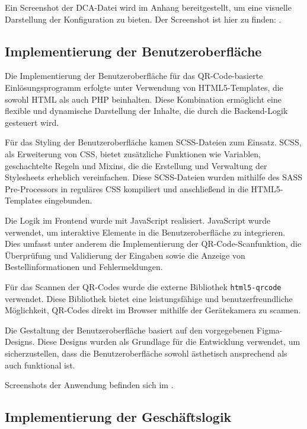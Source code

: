 Ein Screenshot der DCA-Datei wird im Anhang bereitgestellt, um eine visuelle Darstellung der Konfiguration zu bieten. Der Screenshot ist hier zu finden: .

\subsection{Implementierung der Benutzeroberfläche}
\label{sec:ImplementierungBenutzeroberflaeche}

Die Implementierung der Benutzeroberfläche für das QR-Code-basierte Einlösungsprogramm erfolgte unter Verwendung von HTML5-Templates, die sowohl \acs{HTML} als auch \acs{PHP} beinhalten. Diese Kombination ermöglicht eine flexible und dynamische Darstellung der Inhalte, die durch die Backend-Logik gesteuert wird.

Für das Styling der Benutzeroberfläche kamen SCSS-Dateien zum Einsatz. \acs{SCSS}, als Erweiterung von \acs{CSS}, bietet zusätzliche Funktionen wie Variablen, geschachtelte Regeln und Mixins, die die Erstellung und Verwaltung der Stylesheets erheblich vereinfachen. Diese SCSS-Dateien wurden mithilfe des \acs{SASS} Pre-Processors in reguläres \acs{CSS} kompiliert und anschließend in die HTML5-Templates eingebunden.

Die Logik im Frontend wurde mit JavaScript realisiert. JavaScript wurde verwendet, um interaktive Elemente in die Benutzeroberfläche zu integrieren. Dies umfasst unter anderem die Implementierung der QR-Code-Scanfunktion, die Überprüfung und Validierung der Eingaben sowie die Anzeige von Bestellinformationen und Fehlermeldungen.

Für das Scannen der QR-Codes wurde die externe Bibliothek \texttt{html5-qrcode} verwendet. Diese Bibliothek bietet eine leistungsfähige und benutzerfreundliche Möglichkeit, QR-Codes direkt im Browser mithilfe der Gerätekamera zu scannen.

Die Gestaltung der Benutzeroberfläche basiert auf den vorgegebenen Figma-Designs. Diese Designs wurden als Grundlage für die Entwicklung verwendet, um sicherzustellen, dass die Benutzeroberfläche sowohl ästhetisch ansprechend als auch funktional ist.

Screenshots der Anwendung befinden sich im .


\subsection{Implementierung der Geschäftslogik}
\label{sec:ImplementierungGeschaeftslogik}

